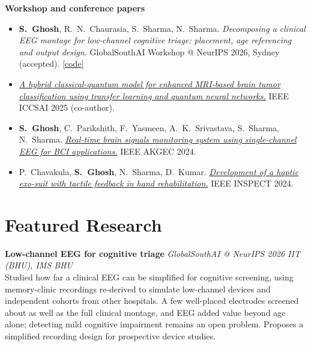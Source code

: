 \documentclass[10pt,a4paper]{article}
\newcommand{\project}[3]{
  \noindent\textbf{#1} \hfill \textit{\small #2} \\
  {\small #3} \par
  \vspace{4pt}
}
\newcommand{\me}{\textbf{S.~Ghosh}}
\begin{document}
\noindent\textbf{\small Workshop and conference papers}
\begin{itemize}
    \item \me, R.~N.~Chaurasia, S.~Sharma, N.~Sharma. \textit{Decomposing a clinical EEG montage for low-channel cognitive triage: placement, age referencing and output design.} GlobalSouthAI Workshop @ NeurIPS 2026, Sydney (accepted). \href{https://github.com/soinikghosh9/lowchannel-eeg-triage}{[code]}
    \item \href{https://doi.org/10.1109/ICCSAI64074.2025.11064720}{\textit{A hybrid classical-quantum model for enhanced MRI-based brain tumor classification using transfer learning and quantum neural networks.}} IEEE ICCSAI 2025 (co-author).
    \item \me, C.~Parikshith, F.~Yasmeen, A.~K.~Srivastava, S.~Sharma, N.~Sharma. \href{https://doi.org/10.1109/AKGEC62572.2024.10868917}{\textit{Real-time brain signals monitoring system using single-channel EEG for BCI applications.}} IEEE AKGEC 2024.
    \item P.~Chavakula, \me, N.~Sharma, D.~Kumar. \href{https://doi.org/10.1109/INSPECT63485.2024.10896072}{\textit{Development of a haptic exo-suit with tactile feedback in hand rehabilitation.}} IEEE INSPECT 2024.
\end{itemize}

\vspace{6pt}

\section{Featured Research}
\project{Low-channel EEG for cognitive triage}{GlobalSouthAI @ NeurIPS 2026 \textbullet{} IIT (BHU), IMS BHU}
{Studied how far a clinical EEG can be simplified for cognitive screening, using memory-clinic recordings re-derived to simulate low-channel devices and independent cohorts from other hospitals. A few well-placed electrodes screened about as well as the full clinical montage, and EEG added value beyond age alone; detecting mild cognitive impairment remains an open problem. Proposes a simplified recording design for prospective device studies.}

\end{document}
